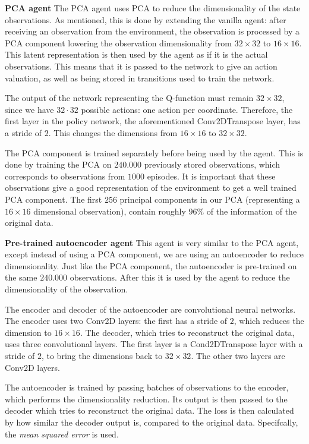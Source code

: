 \noindent \textbf{PCA agent}\newline
\noindent The PCA agent uses PCA to reduce the dimensionality of the state observations. As mentioned, this is done by extending the vanilla agent: after receiving an observation from the environment, the observation is processed by a PCA component lowering the observation dimensionality from $32 \times 32$ to $16 \times 16$. This latent representation is then used by the agent as if it is the actual observations. This means that it is passed to the network to give an action valuation, as well as being stored in transitions used to train the network.

The output of the network representing the Q-function must remain $32 \times 32$, since we have $32 \cdot 32$ possible actions: one action per coordinate. Therefore, the first layer in the policy network, the aforementioned Conv2DTranspose layer, has a stride of $2$. This changes the dimensions from $16 \times 16$ to $32 \times 32$. 

The PCA component is trained separately before being used by the agent. This is done by training the PCA on $240.000$ previously stored observations, which corresponds to observations from $1000$ episodes. It is important that these observations give a good representation of the environment to get a well trained PCA component. The first $256$ principal components in our PCA (representing a $16 \times 16$ dimensional observation), contain roughly $96\%$ of the information of the original data.\newline

\noindent \textbf{Pre-trained autoencoder agent}\newline
\noindent This agent is very similar to the PCA agent, except instead of using a PCA component, we are using an autoencoder to reduce dimensionality. Just like the PCA component, the autoencoder is pre-trained on the same $240.000$ observations. After this it is used by the agent to reduce the dimensionality of the observation. 

The encoder and decoder of the autoencoder are convolutional neural networks. The encoder uses two Conv2D layers: the first has a stride of $2$, which reduces the dimension to $16 \times 16$. The decoder, which tries to reconstruct the original data, uses three convolutional layers. The first layer is a Cond2DTranspose layer with a stride of $2$, to bring the dimensions back to $32 \times 32$. The other two layers are Conv2D layers. 

The autoencoder is trained by passing batches of observations to the encoder, which performs the dimensionality reduction. Its output is then passed to the decoder which tries to reconstruct the original data. The loss is then calculated by how similar the decoder output is, compared to the original data. Specifcally, the \emph{mean squared error} is used.

